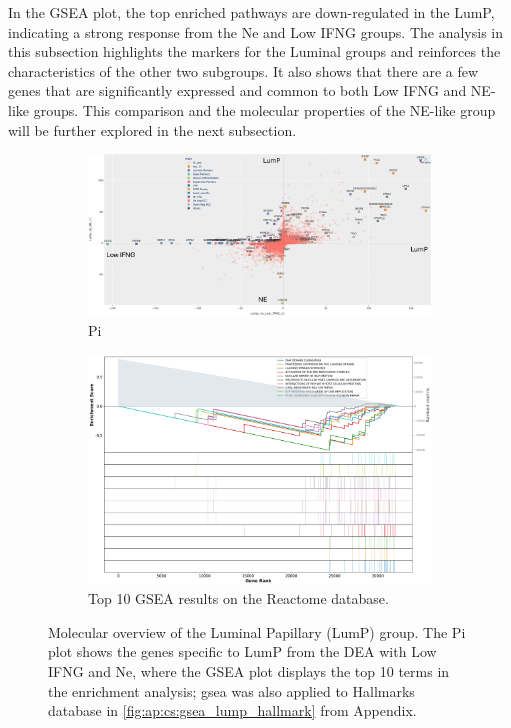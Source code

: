 In the GSEA plot, the top enriched pathways are down-regulated in the LumP, indicating a strong response from the Ne and Low IFNG groups. The analysis in this subsection highlights the markers for the Luminal groups and reinforces the characteristics of the other two subgroups. It also shows that there are a few genes that are significantly expressed and common to both Low IFNG and NE-like groups. This comparison and the molecular properties of the NE-like group will be further explored in the next subsection.


\begin{figure}[H]
    \centering
    \begin{subfigure}[!t]{1.0\textwidth}
        \includegraphics[width=\textwidth,keepaspectratio]{Sections/ClusteringAnalysis/Resources/discussion/other_groups/lump_pi.png}    
        \caption{Pi}
        \label{fig:cs:lumP_pi}
    \end{subfigure}
    \centering
    \begin{subfigure}[!t]{0.91\textwidth}
        \includegraphics[width=\textwidth, keepaspectratio]{Sections/ClusteringAnalysis/Resources/discussion/other_groups/lumP2_reactome_10_top.png}
        \caption{Top 10 GSEA results on the Reactome database.}
        \label{fig:cs:lumP_gsea}
    \end{subfigure} 
    \centering
    \caption{Molecular overview of the Luminal Papillary (LumP) group. The Pi plot shows the genes specific to LumP from the DEA with Low IFNG and Ne, where the GSEA plot displays the top 10 terms in the enrichment analysis; \acrshort{gsea} was also applied to Hallmarks database in \cref{fig:ap:cs:gsea_lump_hallmark} from Appendix.} 
    \label{fig:cs:lump}
\end{figure}



